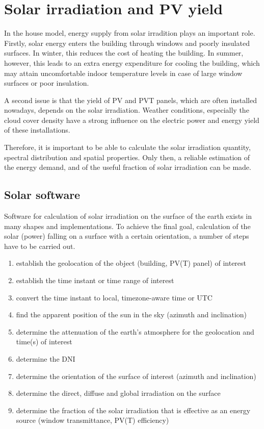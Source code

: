 \section{Solar irradiation and PV yield}\label{s:solar-irradiation}

In the house model, energy supply from solar irradition plays an important role. Firstly, solar energy enters the building through windows and poorly insulated surfaces. In winter, this reduces the cost of heating the building. In summer, however, this leads to an extra energy expenditure for cooling the building, which may attain uncomfortable indoor temperature levels in case of large window surfaces or poor insulation.

A second issue is that the yield of PV and PVT panels, which are often installed nowadays, depends on the solar irradiation. Weather conditions, especially the cloud cover density have a strong influence on the electric power and energy yield of these installations.

Therefore, it is important to be able to calculate the solar irradiation quantity, spectral distribution and spatial properties. Only then, a reliable estimation of the energy demand, and of the useful fraction of solar irradiation can be made.

\subsection{Solar software}

Software for calculation of solar irradiation on the surface of the earth exists in many shapes and implementations. To achieve the final goal, calculation of the solar (power) falling on a surface with a certain orientation, a number of steps have to be carried out.

\begin{enumerate}
	\item establish the geolocation of the object (building, PV(T) panel) of interest
	\item establish the time instant or time range of interest
	\item convert the time instant to local, timezone-aware time or UTC
	\item find the apparent position of the sun in the sky (azimuth and inclination)
	\item determine the attenuation of the earth's atmosphere for the geolocation and time(s) of interest
	\item determine the DNI 
	\item determine the orientation of the surface of interest (azimuth and inclination)
	\item determine the direct, diffuse and global irradiation on the surface
	\item determine the fraction of the solar irradiation that is effective as an energy source (window transmittance, PV(T) efficiency)
\end{enumerate}

